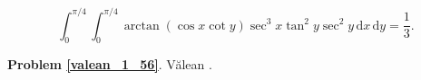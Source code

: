 %

\begin{problem_with_solution}
    \label{valean_1_56}%
    \begin{equation}
        \int_0^{\pi/4} \int_0^{\pi/4} \arctan (\cos x \cot y) \sec^3 x \tan^2 y \sec^2 y \,\mathrm{d}x \,\mathrm{d}y = \frac 1 3.
    \end{equation}
\end{problem_with_solution}


\textbf{Problem \ref{valean_1_56}}.
Vălean \cite[s. 35]{nahin15}.


%